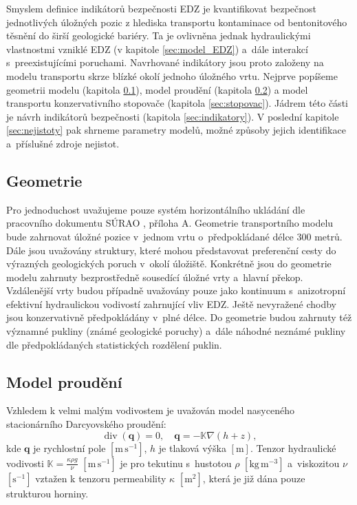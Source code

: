 \documentclass{article}
\def\unit#1{\mathrm{#1}}
\def\grad{\nabla}
\def\div{\operatorname{div}}
\def\vc#1{\mathbf{\boldsymbol{#1}}}     %
\def\tn#1{{\mathbb{#1}}}    %
\begin{document}
Smyslem definice indikátorů bezpečnosti EDZ je kvantifikovat bezpečnost jednotlivých úložných pozic z hlediska 
transportu kontaminace od bentonitového těsnění do širší geologické bariéry. Ta je ovlivněna jednak hydraulickými vlastnostmi
vzniklé EDZ (v kapitole \ref{sec:model_EDZ}) a~dále interakcí s~preexistujícími poruchami. 
Navrhované indikátory jsou proto založeny na modelu transportu skrze blízké okolí jednoho úložného vrtu. 
Nejprve popíšeme geometrii modelu (kapitola  \ref{sec:transport_geometrie}), model proudění (kapitola \ref{sec:transport_flow})
a model transportu konzervativního stopovače (kapitola \ref{sec:stopovac}). Jádrem této části je návrh indikátorů bezpečnosti (kapitola \ref{sec:indikatory}). 
V poslední kapitole \ref{sec:nejistoty} pak shrneme parametry modelů, možné způsoby jejich identifikace a~příslušné zdroje nejistot.



\subsection{Geometrie}
\label{sec:transport_geometrie}
 Pro jednoduchost uvažujeme pouze systém horizontálního ukládání dle pracovního dokumentu SÚRAO , příloha A. 
 Geometrie transportního modelu bude zahrnovat úložné pozice v~jednom vrtu o~předpokládané délce 300 metrů. 
 Dále jsou uvažovány  struktury, které mohou představovat preferenční cesty do výrazných geologických poruch v~okolí úložiště. 
 Konkrétně jsou do geometrie modelu zahrnuty bezprostředně sousedící úložné vrty a~hlavní překop. Vzdálenější vrty budou případně 
 uvažovány pouze jako kontinuum s~anizotropní efektivní hydraulickou vodivostí zahrnující vliv EDZ. 
Ještě nevyražené chodby jsou konzervativně předpokládány v~plné délce. Do geometrie budou zahrnuty též významné pukliny 
(známé geologické poruchy) a~dále náhodné neznámé pukliny dle předpokládaných statistických rozdělení puklin.


\subsection{Model proudění}
\label{sec:transport_flow}
Vzhledem k velmi malým vodivostem je uvažován model nasyceného stacionárního Darcyovského proudění:
\[
    \div(\vc q) = 0, \quad \vc q = -\tn K \grad (h + z),
\]
kde $\vc q$ je rychlostní pole $[\unit{m\,s^{-1}}]$, $h$ je tlaková výška $[\unit{m}]$. Tenzor hydraulické vodivosti $\tn K =\frac{\kappa \rho g}{\nu}$
 $[\unit{m\,s^{-1}}]$ je pro tekutinu s~hustotou $\rho$ $[\unit{kg\, m^{-3}}]$ a~viskozitou $\nu$ $[\unit{s^{-1}}]$ vztažen k tenzoru permeability $\kappa$ $[\unit{m^2}]$, která je již dána pouze strukturou horniny.
 
\end{document}
